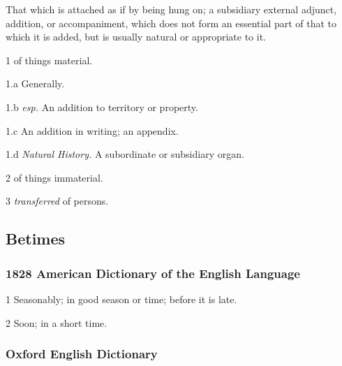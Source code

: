 			\begin{compactitem}
				\item That which is attached as if by being hung on; a subsidiary external adjunct, addition, or accompaniment, which does not form an essential part of that to which it is added, but is usually natural or appropriate to it.
				\item[1] of things material.
				\item[1.a] Generally.
				\item[1.b] \textit{esp.} An addition to territory or property.
				\item[1.c] An addition in writing; an appendix.
				\item[1.d] \textit{Natural History.} A subordinate or subsidiary organ.
				\item[2] of things immaterial.
				\item[3] \textit{transferred} of persons.
			\end{compactitem} 


	\subsection{Betimes} %
		\label{BETIMES}
		
		\subsubsection{1828 American Dictionary of the English Language}
		
			\begin{compactitem}
				\item[1] Seasonably; in good season or time; before it is late.
				\item[2] Soon; in a short time.
			\end{compactitem}
		
		\subsubsection{Oxford English Dictionary}
		
